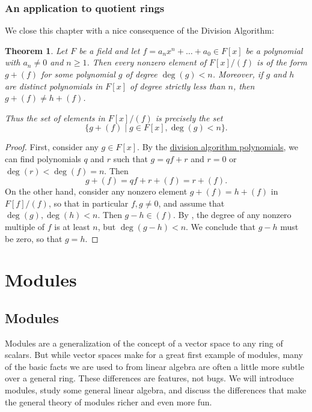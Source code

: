 \documentclass[12pt]{report}
\newtheorem{theorem}{Theorem}[chapter]
\numberwithin{equation}{section}
\numberwithin{theorem}{chapter}
\theoremstyle{definition}
\newtheorem*{basic properties}{Basic Properties}
\newtheorem*{Important Remark}{Important Remark}
\begin{document}
\section{An application to quotient rings}


We close this chapter with a nice consequence of the Division Algorithm:


\begin{theorem}
	Let $F$ be a field and let $f = a_nx^n + \ldots + a_0 \in F[x]$ be a polynomial with $a_n \neq 0$ and $n \geqslant 1$. Then every nonzero element of $F[x]/(f)$ is of the form $g + (f)$ for some polynomial $g$ of degree $\deg(g)<n$. Moreover, if $g$ and $h$ are distinct polynomials in $F[x]$ of degree strictly less than $n$, then $g+(f) \neq h + (f)$.
	
	Thus the set of elements in $F[x]/(f)$ is precisely the set
	$$\{ g+(f) \mid g \in F[x], \deg(g)< n \}.$$
\end{theorem}


\begin{proof}
	First, consider any $g \in F[x]$. By the \hyperref[Division Algorithm]{division algorithm polynomials}, we can find polynomials $q$ and $r$ such that $g=qf+r$ and $r = 0$ or $\deg(r)<\deg(f)=n$. Then
	$$g + (f) = qf+r+(f) = r+(f).$$
	On the other hand, consider any nonzero element $g+(f) = h+(f)$ in $F[f]/(f)$, so that in particular $f, g \neq 0$, and assume that $\deg(g), \deg(h) < n$. Then $g-h \in (f)$. By , the degree of any nonzero multiple of $f$ is at least $n$, but $\deg(g-h) < n$. We conclude that $g-h$ must be zero, so that $g=h$.
\end{proof}








\part{Modules}







\chapter{Modules}

Modules are a generalization of the concept of a vector space to any ring of scalars. But while vector spaces make for a great first example of modules, many of the basic facts we are used to from linear algebra are often a little more subtle over a general ring. These differences are features, not bugs. We will introduce modules, study some general linear algebra, and discuss the differences that make the general theory of modules richer and even more fun.
\end{document}
